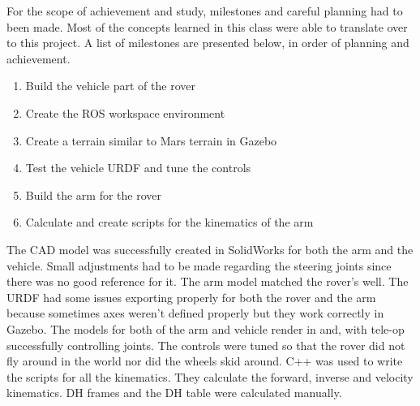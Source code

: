 For the scope of achievement and study, milestones and careful planning had to been made. Most of the concepts learned in this class were able to translate over to this project. 
A list of milestones are presented below, in order of planning and achievement. 

\begin{enumerate}
	\item Build the vehicle part of the rover
	\item Create the ROS workspace environment
	\item Create a terrain similar to Mars terrain in Gazebo
	\item Test the vehicle URDF and tune the controls
	\item Build the arm for the rover
	\item Calculate and create scripts for the kinematics of the arm
\end{enumerate}

The CAD model was successfully created in SolidWorks for both the arm and the vehicle. Small adjustments had to be made regarding the steering joints since there was no good reference for it. The arm model matched the rover’s well. The URDF had some issues exporting properly for both the rover and the arm because sometimes axes weren’t defined properly but they work correctly in Gazebo. The models for both of the arm and vehicle render in and, with tele-op successfully controlling joints. The controls were tuned so that the rover did not fly around in the world nor did the wheels skid around. C++ was used to write the scripts for all the kinematics. They calculate the forward, inverse and velocity kinematics. DH frames and the DH table were calculated manually.
